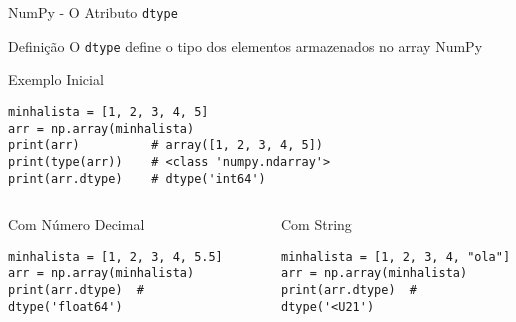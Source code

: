 \begin{frame}[fragile]{NumPy - O Atributo \texttt{dtype}}

    \begin{block}{Definição}
        O \texttt{dtype} define o tipo dos elementos armazenados no array NumPy
    \end{block}

    \begin{exampleblock}{Exemplo Inicial}
        \begin{verbatim}
minhalista = [1, 2, 3, 4, 5]
arr = np.array(minhalista)
print(arr)          # array([1, 2, 3, 4, 5])
print(type(arr))    # <class 'numpy.ndarray'>
print(arr.dtype)    # dtype('int64')
\end{verbatim}
    \end{exampleblock}

    \begin{columns}[T]
        \begin{column}{0.5\textwidth}
            \begin{alertblock}{Com Número Decimal}
                \begin{verbatim}
minhalista = [1, 2, 3, 4, 5.5]
arr = np.array(minhalista)
print(arr.dtype)  # dtype('float64')
\end{verbatim}
            \end{alertblock}
        \end{column}

        \begin{column}{0.5\textwidth}
            \begin{alertblock}{Com String}
                \begin{verbatim}
minhalista = [1, 2, 3, 4, "ola"]
arr = np.array(minhalista)
print(arr.dtype)  # dtype('<U21')
\end{verbatim}
            \end{alertblock}
        \end{column}
    \end{columns}


\end{frame}


